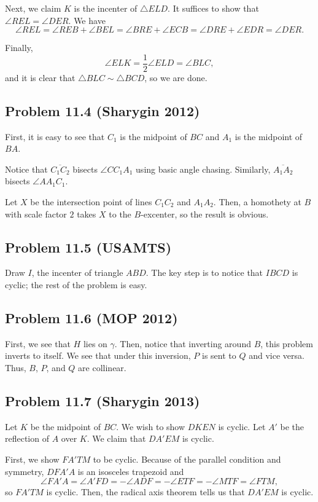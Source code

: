 \documentclass{scrartcl}
\begin{document}
Next, we claim $K$ is the incenter of $\triangle ELD$. It suffices to show that $\angle REL = \angle DER$.
We have
\[ \angle REL = \angle REB + \angle BEL = \angle BRE + \angle ECB = \angle DRE + \angle EDR = \angle DER. \]

Finally,
\[ \angle ELK = \frac12 \angle ELD = \angle BLC, \]
and it is clear that $\triangle BLC \sim \triangle BCD$, so we are done.

\subsection*{Problem 11.4 (Sharygin 2012)}
First, it is easy to see that $C_1$ is the midpoint of $BC$ and $A_1$ is the midpoint of $BA$.

Notice that $\overline{C_1C_2}$ bisects $\angle CC_1A_1$ using basic angle chasing. Similarly,
$\overline{A_1A_2}$ bisects $\angle AA_1C_1$.

Let $X$ be the intersection point of lines $C_1C_2$ and $A_1A_2$. Then, a homothety at $B$ with scale factor $2$
takes $X$ to the $B$-excenter, so the result is obvious.

\subsection*{Problem 11.5 (USAMTS)}
Draw $I$, the incenter of triangle $ABD$. The key step is to notice that $IBCD$ is cyclic; the rest of the problem is easy.

\subsection*{Problem 11.6 (MOP 2012)}
First, we see that $H$ lies on $\gamma$. Then, notice that inverting around $B$, this problem inverts to itself. We see that under this inversion, $P$ is sent to $Q$ and
vice versa. Thus, $B$, $P$, and $Q$ are collinear.

\subsection*{Problem 11.7 (Sharygin 2013)}
Let $K$ be the midpoint of $BC$. We wish to show $DKEN$ is cyclic. Let $A'$ be the reflection of $A$ over $K$. We claim that $DA'EM$ is cyclic.

First, we show $FA'TM$ to be cyclic. Because of the parallel condition and symmetry, $DFA'A$ is an isosceles trapezoid and
\[ \angle FA'A = \angle A'FD = -\angle ADF = -\angle ETF = -\angle MTF = \angle FTM, \]
so $FA'TM$ is cyclic. Then, the radical axis theorem tells us that $DA'EM$ is cyclic.
\end{document}
